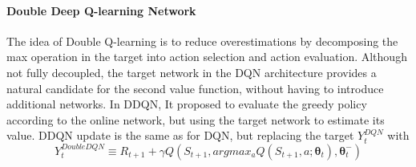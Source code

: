 \paragraph{Double Deep Q-learning Network} The idea of Double Q-learning\cite{van2016deep} is to reduce overestimations by decomposing the max operation in the target into action selection and action evaluation. Although not fully decoupled, the target network in the DQN architecture provides a natural candidate for the second value function, without having to introduce additional networks. In DDQN, It proposed to evaluate the greedy policy according to the online network, but using the target network to estimate its value. DDQN update is the same as for DQN, but replacing the target $Y_{t}^{DQN}$ with
\begin{equation}
Y_{t}^{DoubleDQN} \equiv R_{t+1} + \gamma Q(S_{t+1}, argmax_{a}Q(S_{t+1},a;\bm{\theta}_{t}), \bm{\theta}_{t}^{-})
\end{equation}